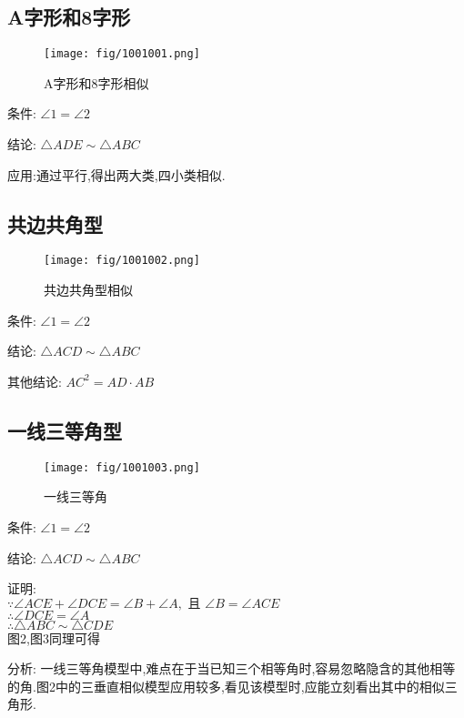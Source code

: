 \documentclass[cn,blue,10pt]{elegantbook}
\begin{document}
\subsection{A字形和8字形}%
\label{sub:a_8模型}

\begin{figure}[H]
    \centering
    \texttt{[image: fig/1001001.png]}
    \caption{A字形和8字形相似}%
\end{figure}
条件: \(\angle 1 = \angle 2\)

结论: \(\triangle ADE \sim \triangle ABC\)

应用:通过平行,得出两大类,四小类相似.

\subsection{共边共角型}%
\label{sub:共边共角型}
\begin{figure}[H]
    \centering
    \texttt{[image: fig/1001002.png]}
    \caption{共边共角型相似}%
    \label{fig:相似A8模型}
\end{figure}
条件: \(\angle 1 = \angle 2\) 

结论: \(\triangle ACD \sim \triangle ABC\) 

其他结论: \(AC^2 = AD \cdot AB\)

\subsection{一线三等角型}%
\label{sub:一线三等角型}
\begin{figure}[H]
    \centering
    \texttt{[image: fig/1001003.png]}
    \caption{一线三等角}%
    \label{fig:相似A8模型}
\end{figure}

条件: \(\angle 1 = \angle 2\) 

结论: \(\triangle ACD \sim \triangle ABC\) 

证明:\\
    \(\because \angle ACE + \angle DCE = \angle B + \angle A,\text{ 且 } \angle B = \angle ACE\) \\
    \(\therefore \angle DCE = \angle A \) \\
    \(\therefore \triangle ABC \sim \triangle CDE\) \\
    图2,图3同理可得

分析: 一线三等角模型中,难点在于当已知三个相等角时,容易忽略隐含的其他相等的角.图2中的三垂直相似模型应用较多,看见该模型时,应能立刻看出其中的相似三角形.
\end{document}
